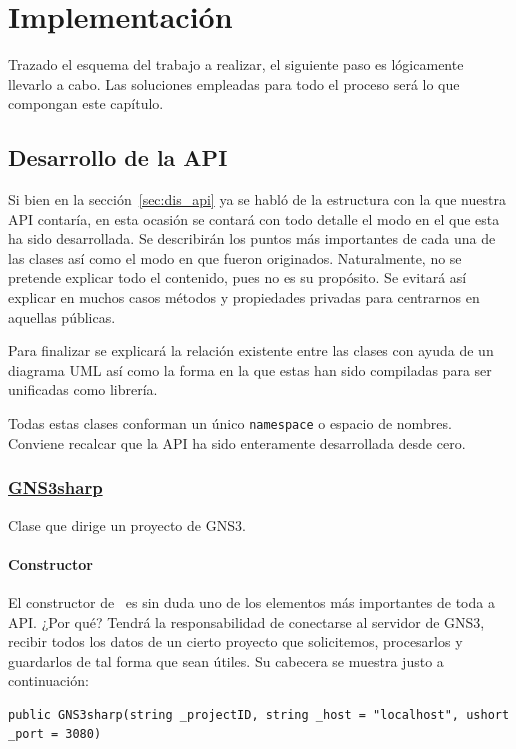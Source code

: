 \chapter{Implementación}\label{chap:Integration}
Trazado el esquema del trabajo a realizar, el siguiente paso es lógicamente llevarlo a cabo. Las soluciones empleadas para todo el proceso será lo que compongan este capítulo.

\section{Desarrollo de la API}
Si bien en la sección~\ref{sec:dis_api} ya se habló de la estructura con la que nuestra API contaría, en esta ocasión se contará con todo detalle el modo en el que esta ha sido desarrollada. Se describirán los puntos más importantes de cada una de las clases así como el modo en que fueron originados. Naturalmente, no se pretende explicar todo el contenido, pues no es su propósito. Se evitará así explicar en muchos casos métodos y propiedades privadas para centrarnos en aquellas públicas.

Para finalizar se explicará la relación existente entre las clases con ayuda de un diagrama UML así como la forma en la que estas han sido compiladas para ser unificadas como librería.

Todas estas clases conforman un único \texttt{namespace} o espacio de nombres. Conviene recalcar que la API ha sido enteramente desarrollada desde cero.

\subsection[GNS3sharp]{\href{https://github.com/aorestr/GNS3sharp/blob/master/gsn3sharp.cs}{GNS3sharp}}\label{subsec:gnscsclass}
Clase que dirige un proyecto de GNS3.

\subsubsection{Constructor}
El constructor de \GNSCS~es sin duda uno de los elementos más importantes de toda a API. ¿Por qué? Tendrá la responsabilidad de conectarse al servidor de GNS3, recibir todos los datos de un cierto proyecto que solicitemos, procesarlos y guardarlos de tal forma que sean útiles. Su cabecera se muestra justo a continuación:
\begin{lstlisting}[language={[Sharp]C}, caption={Cabecera del constructor de \texttt{GNS3sharp}}, label={gnscs1}]
public GNS3sharp(string _projectID, string _host = "localhost", ushort _port = 3080)
\end{lstlisting}

